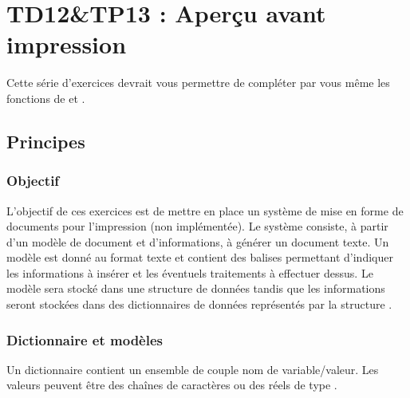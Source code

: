 \chapter{TD12\&TP13 : Aperçu avant impression}

Cette série d'exercices devrait vous permettre de compléter par vous même les fonctions de  et  .

\section{Principes}

\subsection{Objectif}

L'objectif de ces exercices est de mettre en place un système de mise en forme de documents pour l'impression (non implémentée). Le système consiste, à partir d'un modèle de document et d'informations, à générer un document texte. Un modèle est donné au format texte et contient des balises permettant d'indiquer les informations à insérer et les éventuels traitements à effectuer dessus. Le modèle sera stocké dans une structure de données  tandis que les informations seront stockées dans des dictionnaires de données représentés par la structure .

\subsection{Dictionnaire et modèles}

Un dictionnaire contient un ensemble de couple nom de variable/valeur. Les valeurs peuvent être des chaînes de caractères ou des réels de type .

